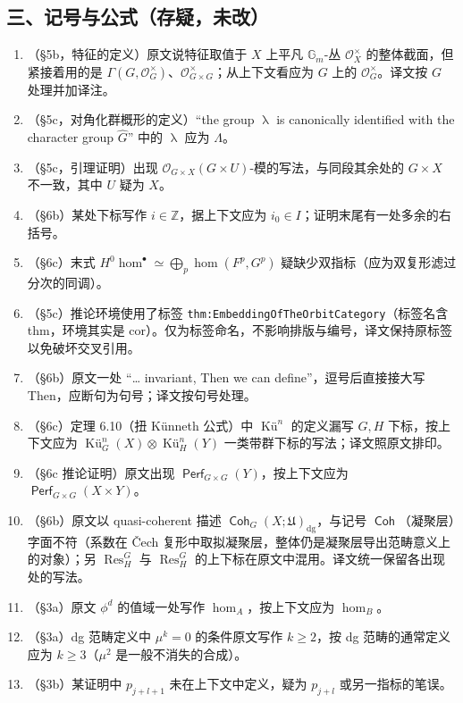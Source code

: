 \documentclass[11pt,a4paper]{article}
\DeclareMathOperator{\Res}{\mathrm{Res}}
\DeclareMathOperator{\Coh}{\mathsf{Coh}}
\DeclareMathOperator{\Perf}{\mathsf{Perf}}
\DeclareMathOperator{\dg}{\operatorname{dg}}
\DeclareMathOperator{\cha}{\lambda}
\DeclareMathOperator{\Ku}{\textrm{Kü}}
\theoremstyle{cnth}
\begin{document}
\subsection*{三、记号与公式（存疑，未改）}
\begin{enumerate}[leftmargin=1.6em,itemsep=2pt,resume]
\item （§5b，特征的定义）原文说特征取值于 $X$ 上平凡 $\mathbb{G}_m$-丛 $\mathcal{O}_X^{\times}$ 的整体截面，但紧接着用的是 $\Gamma(G,\mathcal{O}_G^{\times})$、$\mathcal{O}_{G\times G}^{\times}$；从上下文看应为 $G$ 上的 $\mathcal{O}_G^{\times}$。译文按 $G$ 处理并加译注。
\item （§5c，对角化群概形的定义）``the group $\cha$ is canonically identified with the character group $\widehat{G}$'' 中的 $\cha$ 应为 $\Lambda$。
\item （§5c，引理证明）出现 $\mathcal{O}_{G\times X}(G\times U)$-模的写法，与同段其余处的 $G\times X$ 不一致，其中 $U$ 疑为 $X$。
\item （§6b）某处下标写作 $i\in\mathbb{Z}$，据上下文应为 $i_0\in I$；证明末尾有一处多余的右括号。
\item （§6c）末式 $H^0\hom^{\bullet}\simeq\bigoplus_p\hom(F^p,G^p)$ 疑缺少双指标（应为双复形滤过分次的同调）。
\item （§5c）推论环境使用了标签 \texttt{thm:EmbeddingOfTheOrbitCategory}（标签名含 thm，环境其实是 cor）。仅为标签命名，不影响排版与编号，译文保持原标签以免破坏交叉引用。
\item （§6b）原文一处 ``\ldots{} invariant, Then we can define''，逗号后直接接大写 Then，应断句为句号；译文按句号处理。
\item （§6c）定理 6.10（扭 Künneth 公式）中 $\Ku^n$ 的定义漏写 $G,H$ 下标，按上下文应为 $\Ku^n_G(X)\otimes\Ku^n_H(Y)$ 一类带群下标的写法；译文照原文排印。
\item （§6c 推论证明）原文出现 $\Perf_{G\times G}(Y)$，按上下文应为 $\Perf_{G\times G}(X\times Y)$。
\item （§6b）原文以 quasi-coherent 描述 $\Coh_G(X;\mathfrak{U})_{\dg}$，与记号 $\Coh$（凝聚层）字面不符（系数在 Čech 复形中取拟凝聚层，整体仍是凝聚层导出范畴意义上的对象）；另 $\Res^G_H$ 与 $\Res_H^G$ 的上下标在原文中混用。译文统一保留各出现处的写法。
\item （§3a）原文 $\phi^d$ 的值域一处写作 $\hom_A$，按上下文应为 $\hom_B$。
\item （§3a）dg 范畴定义中 $\mu^k=0$ 的条件原文写作 $k\ge 2$，按 dg 范畴的通常定义应为 $k\ge 3$（$\mu^2$ 是一般不消失的合成）。
\item （§3b）某证明中 $p_{j+l+1}$ 未在上下文中定义，疑为 $p_{j+l}$ 或另一指标的笔误。
\end{enumerate}
\end{document}
